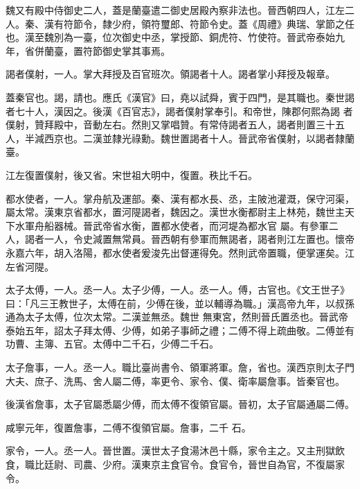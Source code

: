 \begin{pinyinscope}
 魏又有殿中侍御史二人，蓋是蘭臺遣二御史居殿內察非法也。晉西朝四人，江左二
 人。秦、漢有符節令，隸少府，領符璽郎、符節令史。蓋《周禮》典瑞、掌節之任也。漢至魏別為一臺，位次御史中丞，掌授節、銅虎符、竹使符。晉武帝泰始九年，省併蘭臺，置符節御史掌其事焉。



 謁者僕射，一人。掌大拜授及百官班次。領謁者十人。謁者掌小拜授及報章。



 蓋秦官也。謁，請也。應氏《漢官》曰，堯以試舜，賓于四門，是其職也。秦世謁者七十人，漢因之。後漢《百官志》，謁者僕射掌奉引。和帝世，陳郡何熙為謁
 者僕射，贊拜殿中，音動左右。然則又掌唱贊。有常侍謁者五人，謁者則置三十五人，半減西京也。二漢並隸光祿勳。魏世置謁者十人。晉武帝省僕射，以謁者隸蘭臺。



 江左復置僕射，後又省。宋世祖大明中，復置。秩比千石。



 都水使者，一人。掌舟航及運部。秦、漢有都水長、丞，主陂池灌溉，保守河渠，屬太常。漢東京省都水，置河隄謁者，魏因之。漢世水衡都尉主上林苑，魏世主天下水軍舟船器械。晉武帝省水衡，置都水使者，而河堤為都水官
 屬。有參軍二人，謁者一人，令史減置無常員。晉西朝有參軍而無謁者，謁者則江左置也。懷帝永嘉六年，胡入洛陽，都水使者爰浚先出督運得免。然則武帝置職，便掌運矣。江左省河隄。



 太子太傅，一人。丞一人。太子少傅，一人。丞一人。傅，古官也。《文王世子》曰：「凡三王教世子，太傅在前，少傅在後，並以輔導為職。」漢高帝九年，以叔孫通為太子太傅，位次太常。二漢並無丞。魏世
 無東宮，然則晉氏置丞也。晉武帝泰始五年，詔太子拜太傅、少傅，如弟子事師之禮；二傅不得上疏曲敬。二傅並有功曹、主簿、五官。太傅中二千石，少傅二千石。



 太子詹事，一人。丞一人。職比臺尚書令、領軍將軍。詹，省也。漢西京則太子門大夫、庶子、洗馬、舍人屬二傅，率更令、家令、僕、衛率屬詹事。皆秦官也。



 後漢省詹事，太子官屬悉屬少傅，而太傅不復領官屬。晉初，太子官屬通屬二傅。



 咸寧元年，復置詹事，二傅不復領官屬。詹事，二千
 石。



 家令，一人。丞一人。晉世置。漢世太子食湯沐邑十縣，家令主之。又主刑獄飲食，職比廷尉、司農、少府。漢東京主食官令。食官令，晉世自為官，不復屬家令。




\end{pinyinscope}
